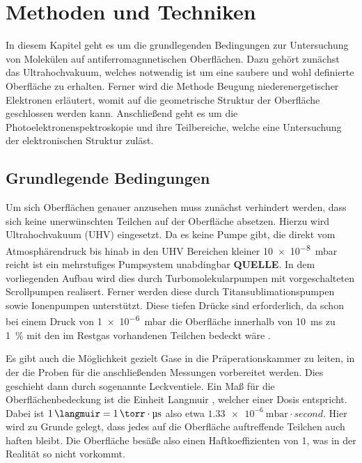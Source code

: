 \chapter{Methoden und Techniken} \label{cha:Methoden}
    In diesem Kapitel geht es um die grundlegenden Bedingungen zur Untersuchung von Molekülen auf antiferromagnnetischen Oberflächen.
    Dazu gehört zunächst das Ultrahochvakuum, welches notwendig ist um eine saubere und wohl definierte Oberfläche zu erhalten.
    Ferner wird die Methode Beugung niederenergetischer Elektronen erläutert, womit auf die geometrische Struktur der Oberfläche geschlossen werden kann.
    Anschließend geht es um die Photoelektronenspektroskopie und ihre Teilbereiche, welche eine Untersuchung der elektronischen Struktur zuläst.

    \section{Grundlegende Bedingungen} \label{sec:Grundlagen}
        Um sich Oberflächen genauer anzusehen muss zunächst verhindert werden, dass sich keine unerwünschten Teilchen auf der Oberfläche absetzen.
        Hierzu wird Ultrahochvakuum (UHV) eingesetzt.
        Da es keine Pumpe gibt, die direkt vom Atmosphärendruck bis hinab in den UHV Bereichen kleiner \SI{10e-8}{\milli\bar} reicht ist ein mehrstufiges Pumpsystem unabdingbar \textbf{QUELLE}.
        In dem vorliegenden Aufbau wird dies durch Turbomolekularpumpen mit vorgeschalteten Scrollpumpen realisert.
        Ferner werden diese durch Titansublimationspumpen sowie Ionenpumpen unterstützt.
        Diese tiefen Drücke sind erforderlich, da schon bei einem Druck von \SI{1e-6}{\milli\bar} die Oberfläche innerhalb von \SI{10}{\milli\second} zu \SI{1}{\percent} mit den im Restgas vorhandenen Teilchen bedeckt wäre \cite{henzler}.

        Es gibt auch die Möglichkeit gezielt Gase in die Präperationskammer zu leiten, in der die Proben für die anschließenden Messungen vorbereitet werden.
        Dies geschieht dann durch sogenannte Leckventiele.
        Ein Maß für die Oberflächenbedeckung ist die Einheit Langmuir \si{\langmuir}, welcher einer Dosis entspricht.
        Dabei ist $\SI{1}{\langmuir} = \SI{1}{\torr} \cdot \si{\micro\second}$ also etwa $\SI{1.33e-6}{\milli\bar} \cdot \si{second}$.
        Hier wird zu Grunde gelegt, dass jedes auf die Oberfläche auftreffende Teilchen auch haften bleibt. 
        Die Oberfläche besäße also einen Haftkoeffizienten von \num{1}, was in der Realität so nicht vorkommt.


